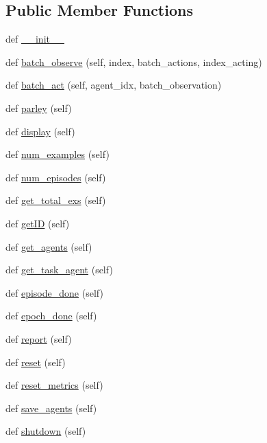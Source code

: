 \subsection*{Public Member Functions}
\begin{DoxyCompactItemize}
\item 
def \hyperlink{classparlai_1_1core_1_1worlds_1_1BatchWorld_a5235cdc5489274463245e6033fdf085b}{\+\_\+\+\_\+init\+\_\+\+\_\+}
\item 
def \hyperlink{classparlai_1_1core_1_1worlds_1_1BatchWorld_a01faab842dc28b580dcaeacee491c5f5}{batch\+\_\+observe} (self, index, batch\+\_\+actions, index\+\_\+acting)
\item 
def \hyperlink{classparlai_1_1core_1_1worlds_1_1BatchWorld_a0bf69fe51e7eb0f8ba2fc3748c8c9181}{batch\+\_\+act} (self, agent\+\_\+idx, batch\+\_\+observation)
\item 
def \hyperlink{classparlai_1_1core_1_1worlds_1_1BatchWorld_a297ab42faba47581774cd9333c874905}{parley} (self)
\item 
def \hyperlink{classparlai_1_1core_1_1worlds_1_1BatchWorld_a2b8dd323969084eedc03a7ab44647117}{display} (self)
\item 
def \hyperlink{classparlai_1_1core_1_1worlds_1_1BatchWorld_a047736ed3867bf7631af02f8eb0528d8}{num\+\_\+examples} (self)
\item 
def \hyperlink{classparlai_1_1core_1_1worlds_1_1BatchWorld_ae3f96cd2de72eb0f333cb29bbf74177b}{num\+\_\+episodes} (self)
\item 
def \hyperlink{classparlai_1_1core_1_1worlds_1_1BatchWorld_ae9aec5868c6870316b6f1983a1e5e0ae}{get\+\_\+total\+\_\+exs} (self)
\item 
def \hyperlink{classparlai_1_1core_1_1worlds_1_1BatchWorld_a995d9405ae22301e3ca46c43521b301a}{get\+ID} (self)
\item 
def \hyperlink{classparlai_1_1core_1_1worlds_1_1BatchWorld_a1fc7faff8ccc60606ccff891d36e6b86}{get\+\_\+agents} (self)
\item 
def \hyperlink{classparlai_1_1core_1_1worlds_1_1BatchWorld_ab57e642368837b1a9ae79231ee213d46}{get\+\_\+task\+\_\+agent} (self)
\item 
def \hyperlink{classparlai_1_1core_1_1worlds_1_1BatchWorld_aa3ef1275372635073ba5cba7df0d1f5d}{episode\+\_\+done} (self)
\item 
def \hyperlink{classparlai_1_1core_1_1worlds_1_1BatchWorld_a006891b1446ef6e593edda1c91cab809}{epoch\+\_\+done} (self)
\item 
def \hyperlink{classparlai_1_1core_1_1worlds_1_1BatchWorld_af6ca90db5542bf4a74a122ea04ba8bef}{report} (self)
\item 
def \hyperlink{classparlai_1_1core_1_1worlds_1_1BatchWorld_a00ba541479129163a13a0377797504e1}{reset} (self)
\item 
def \hyperlink{classparlai_1_1core_1_1worlds_1_1BatchWorld_a16a31209d87f0f9bf27871110bd63aa6}{reset\+\_\+metrics} (self)
\item 
def \hyperlink{classparlai_1_1core_1_1worlds_1_1BatchWorld_a84ee0ac53e07cbfc9bdb8a978a8df7e1}{save\+\_\+agents} (self)
\item 
def \hyperlink{classparlai_1_1core_1_1worlds_1_1BatchWorld_ad351080076e31498e14789beddf6fea6}{shutdown} (self)
\end{DoxyCompactItemize}
